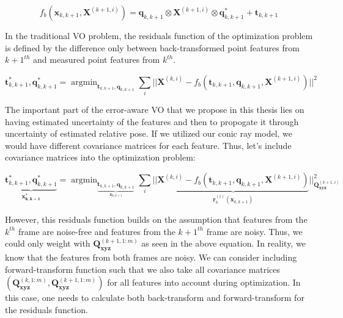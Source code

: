 \documentclass[a4paper]{report}
\numberwithin{figure}{section}
\newcommand{\argmin}{\mathop{\mathrm{argmin}}}
\begin{document}
\begin{equation} f_b(\mathbf{x}_{k,k+1}, \mathbf{X}^{(k+1,i)}) =
\mathbf{q}_{k,k+1} \otimes \mathbf{X}^{(k+1,i)} \otimes \mathbf{q}_{k,k+1}^*
+ \mathbf{t}_{k,k+1} \end{equation}

In the traditional VO problem, the residuals function of the optimization
problem is defined by the difference only between back-transformed point
features from $k+1^{th}$ and measured point features from $k^{th}$.

\begin{equation} \mathbf{t}_{k,k+1}^*, \mathbf{q}_{k,k+1}^* =
\argmin_{\mathbf{t}_{k,k+1}, \mathbf{q}_{k,k+1}} \sum_i|| \mathbf{X}^{(k,i)} -
f_b(\mathbf{t}_{k,k+1}, \mathbf{q}_{k,k+1}, \mathbf{X}^{(k+1,i)})||^2
\end{equation}

The important part of the error-aware VO that we propose in this thesis lies on
having estimated uncertainty of the features and then to propogate it through
uncertainty of estimated relative pose.  If we utilized our conic ray model, we
would have different covariance matrices for each feature.  Thus, let's include
covariance matrices into the optimization problem:

\begin{equation} \underbrace{\mathbf{t}_{k,k+1}^*,
\mathbf{q}_{k,k+1}^*}_{\mathbf{x^*_{k,k+1}}} =
\argmin_{\underbrace{\mathbf{t}_{k,k+1},
\mathbf{q}_{k,k+1}}_{\mathbf{x}_{k,k+1}}} \sum_i||
\underbrace{\mathbf{X}^{(k,i)} - f_b(\mathbf{t}_{k,k+1}, \mathbf{q}_{k,k+1},
\mathbf{X}^{(k+1,i)})} _{\mathbf{r}^{(i)}_{b}(\mathbf{x}_{k,k+1})}
||^2_{\mathbf{Q}^{(k+1,i)}_{\mathbf{xyz}}} \end{equation}


However, this residuals function builds on the assumption that features from
the $k^{th}$ frame are noise-free and features from the $k+1^{th}$ frame are
noisy.  Thus, we could only weight with $\mathbf{Q}^{(k+1,1:m)}_{\mathbf{xyz}}$
as seen in the above equation.  In reality, we know that the features from both
frames are noisy. We can consider including forward-transform function such
that we also take all covariance matrices
$(\mathbf{Q}^{(k,1:m)}_{\mathbf{xyz}}, \mathbf{Q}^{(k+1,1:m)}_{\mathbf{xyz}})$
for all features into account during optimization.  In this case, one needs to
calculate both back-transform and forward-transform for the residuals function.
\end{document}
